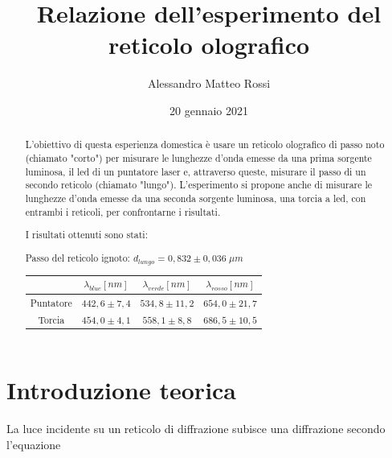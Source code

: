 \documentclass{article}
\title{Relazione dell'esperimento del reticolo olografico}
\author{Alessandro Matteo Rossi}
\date{20 gennaio 2021}
\begin{document}
\maketitle

\begingroup
{}
\begin{abstract}
    \centering
    L'obiettivo di questa esperienza domestica è usare un reticolo olografico di passo noto (chiamato "corto") per misurare le lunghezze d'onda emesse da una prima sorgente luminosa, il led di un puntatore laser e, attraverso queste, misurare il passo di un secondo reticolo (chiamato "lungo").
    L'esperimento si propone anche di misurare le lunghezze d'onda emesse da una seconda sorgente luminosa, una torcia a led, con entrambi i reticoli, per confrontarne i risultati.
    
    I risultati ottenuti sono stati:
    
    Passo del reticolo ignoto: \indent $d_{lungo} = 0,832 \pm 0,036 \; \mu m$

    \begin{table}[h]
        \centering
        \begin{tabular}[h]{||c|c|c|c||}
            \hline
            & \cellcolor{blue}$\lambda_{blue} [nm]$ & \cellcolor{green} $\lambda_{verde}[nm]$ & \cellcolor{red} $\lambda_{rosso}[nm]$\\
            \hline
            Puntatore & $442,6 \pm 7,4$ & $534,8 \pm 11,2$ & $654,0 \pm 21,7$\\
            \hline
            Torcia & $454,0 \pm 4,1$ & $ 558,1 \pm 8,8 $ & $ 686,5 \pm 10,5 $ \\
            \hline
        \end{tabular}
    \end{table}

\end{abstract}
\endgroup



\tableofcontents
\newpage

\section{Introduzione teorica}

La luce incidente su un reticolo di diffrazione subisce una diffrazione secondo l'equazione
\end{document}
